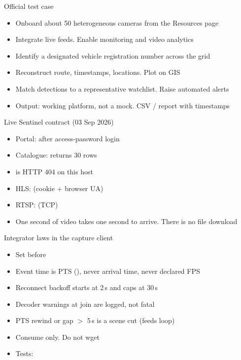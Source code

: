 \documentclass[aspectratio=169,11pt]{beamer}
\begin{document}
\begin{frame}{Official test case}
\begin{itemize}\itemsep0.55em
\item Onboard about 50 heterogeneous cameras from the Resources page
\item Integrate live feeds. Enable monitoring and video analytics
\item Identify a designated vehicle registration number across the grid
\item Reconstruct route, timestamps, locations. Plot on GIS
\item Match detections to a representative watchlist. Raise automated alerts
\item Output: working platform, not a mock. CSV / report with timestamps
\end{itemize}
\end{frame}

\begin{frame}{Live Sentinel contract (03 Sep 2026)}
\begin{itemize}\itemsep0.5em
\item Portal:  after access-password login
\item Catalogue:  returns 30 rows 
\item {} is HTTP 404 on this host
\item HLS:  (cookie + browser UA)
\item RTSP:  (TCP)
\item One second of video takes one second to arrive. There is no file download
\end{itemize}
\end{frame}

\begin{frame}{Integrator laws in the capture client}
\begin{itemize}\itemsep0.45em
\item Set  before 
\item Event time is PTS (), never arrival time, never declared FPS
\item Reconnect backoff starts at 2\,s and caps at 30\,s
\item Decoder warnings at join are logged, not fatal
\item PTS rewind or gap $>$ 5\,s is a scene cut (feeds loop)
\item Consume only. Do not wget 
\item Tests: 
\end{itemize}
\end{frame}
\end{document}
